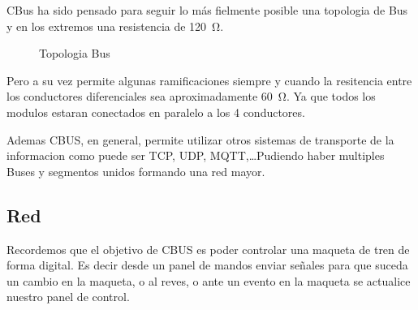 CBus ha sido pensado para seguir lo más fielmente posible una topologia de Bus y en los extremos una resistencia de \SI{120}{\ohm}.

\begin{figure}[H]
    \centering
    \caption{Topologia Bus}
    \label{fig:BusPuro}
\end{figure}
 
Pero a su vez permite algunas ramificaciones siempre y cuando la resitencia entre los conductores diferenciales sea aproximadamente \SI{60}{\ohm}. Ya que todos los modulos estaran conectados en paralelo a los 4 conductores.

Ademas CBUS, en general, permite utilizar otros sistemas de transporte de la informacion como puede ser
TCP, UDP, MQTT,\dots Pudiendo haber multiples Buses y segmentos unidos formando una red mayor.

\subsection{Red}
Recordemos que el objetivo de CBUS es poder controlar una maqueta de tren de forma digital. Es decir desde un
panel de mandos enviar señales para que suceda un cambio en la maqueta, o al reves, o ante un evento en la maqueta
 se actualice nuestro panel de control.

